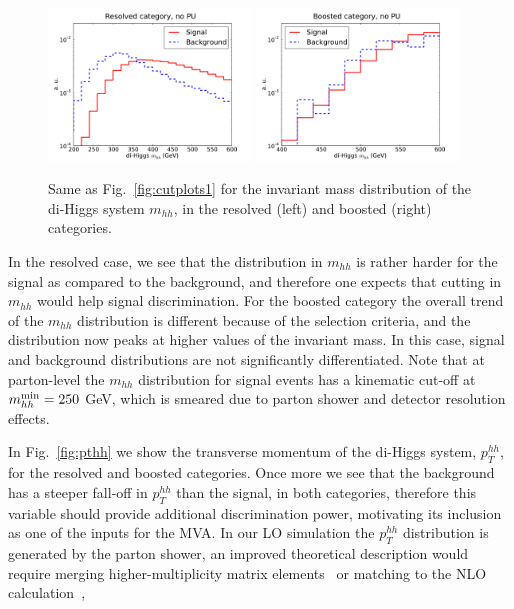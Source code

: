 \begin{figure}[t]
\begin{center}
  \includegraphics[width=0.48\textwidth]{plots/m_HH_C2_res_noPU.pdf}
  \includegraphics[width=0.48\textwidth]{plots/m_HH_C2_bst_noPU.pdf}
  \caption{\small
Same as   Fig.~\ref{fig:cutplots1} for the invariant
mass distribution of the di-Higgs system $m_{hh}$, in
the resolved (left) and boosted (right) categories.
}
\label{fig:mhh}
\end{center}
\end{figure}

In the resolved case, we see that the distribution
in $m_{hh}$ is rather harder for the signal as compared
to the background,
and therefore one expects that cutting in $m_{hh}$ would help signal
discrimination.
%
For the boosted category the overall trend of the $m_{hh}$ distribution
is different because of the selection criteria, and the
distribution now peaks at higher values of the invariant mass.
%
In this case, signal and background distributions are not significantly
differentiated.
%
Note that at parton-level the $m_{hh}$ distribution
for signal events has a kinematic
cut-off at $m_{hh}^{\rm min}=250$ GeV, which is smeared due
to parton shower and detector resolution effects.

In Fig.~\ref{fig:pthh} we show the transverse momentum of
the di-Higgs system, $p_T^{hh}$,
for the resolved and boosted categories.
%
Once more we see that the background has a steeper fall-off in $p_T^{hh}$
than the signal, in both categories, therefore this variable
should provide additional discrimination power, motivating its inclusion
as one of the inputs for the MVA.
%
In our LO simulation the $p_T^{hh}$ distribution is generated
by the parton shower, an improved theoretical
description would require
merging higher-multiplicity
matrix elements~\cite{Maierhofer:2013sha} or matching to
the NLO calculation~\cite{Frederix:2014hta},
%

